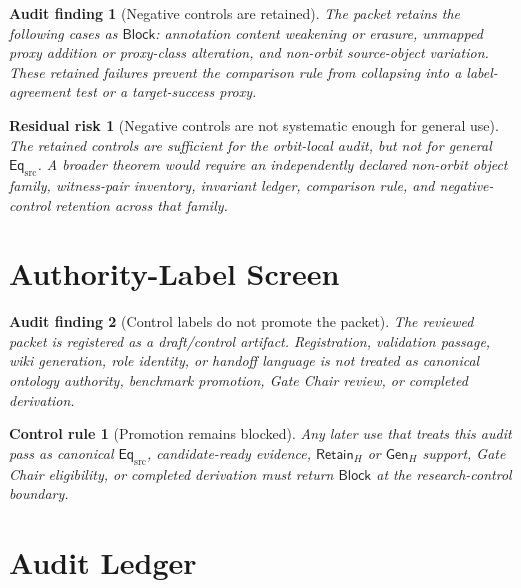 \documentclass[11pt]{article}
\newcommand{\EqSrc}{\mathsf{Eq}_{\mathrm{src}}}
\newcommand{\GenH}{\mathsf{Gen}_{H}}
\newcommand{\RetainH}{\mathsf{Retain}_{H}}
\newcommand{\Block}{\mathsf{Block}}
\newtheorem{auditfinding}{Audit finding}
\newtheorem{residualrisk}{Residual risk}
\newtheorem{controlrule}{Control rule}
\begin{document}
\begin{auditfinding}[Negative controls are retained]
The packet retains the following cases as \(\Block\): annotation content
weakening or erasure, unmapped proxy addition or proxy-class alteration,
and non-orbit source-object variation. These retained failures prevent
the comparison rule from collapsing into a label-agreement test or a
target-success proxy.
\end{auditfinding}

\begin{residualrisk}[Negative controls are not systematic enough for general use]
The retained controls are sufficient for the orbit-local audit, but not
for general \(\EqSrc\). A broader theorem would require an independently
declared non-orbit object family, witness-pair inventory, invariant
ledger, comparison rule, and negative-control retention across that
family.
\end{residualrisk}

\section{Authority-Label Screen}

\begin{auditfinding}[Control labels do not promote the packet]
The reviewed packet is registered as a draft/control artifact.
Registration, validation passage, wiki generation, role identity, or
handoff language is not treated as canonical ontology authority,
benchmark promotion, Gate Chair review, or completed derivation.
\end{auditfinding}

\begin{controlrule}[Promotion remains blocked]
Any later use that treats this audit pass as canonical \(\EqSrc\),
candidate-ready evidence, \(\RetainH\) or \(\GenH\) support, Gate Chair
eligibility, or completed derivation must return \(\Block\) at the
research-control boundary.
\end{controlrule}

\section{Audit Ledger}
\end{document}

